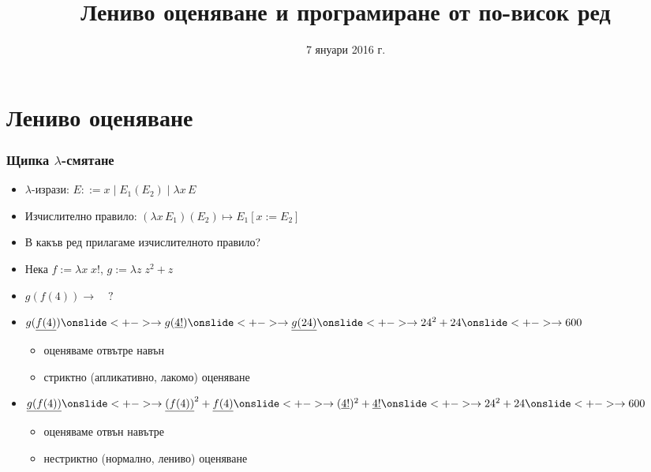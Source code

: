 \documentclass{beamer}
\title[Лениво оценяване]{Лениво оценяване и програмиране от по-висок ред}
\date{7 януари 2016 г.}
\begin{document}
\begin{frame}
  \titlepage
\end{frame}


\section{Лениво оценяване}

\begin{frame}
  \frametitle{Щипка $\lambda$-смятане}
  \newcommand{\lra}{\rightarrow}
  \begin{itemize}[<+->]
  \item $\lambda$-изрази: $E ::= x \;|\; E_1(E_2) \;|\; \lambda x\, E$
  \item Изчислително правило: $(\lambda x\,E_1)(E_2) \mapsto E_1[x := E_2]$
  \item В какъв ред прилагаме изчислителното правило?
  \item Нека $f := \lambda x\; x!$, $g := \lambda z\;z^2+z$
  \item $g(f(4)) \lra \quad ?$
  \item $g(\underline{f(4)})
    \onslide<+->
    \lra g(\underline{4!})
    \onslide<+->
    \lra \underline{g(24)}
    \onslide<+->
    \lra 24^2 + 24
    \onslide<+->
    \lra 600$
    \begin{itemize}
    \item<16-> оценяваме \alert{отвътре навън}
    \item<17-> \alert{стриктно} (апликативно, лакомо) оценяване
    \end{itemize}
  \item $\underline{g(f(4))}
    \onslide<+->
    \lra \underline{(f(4))}^2 + \underline{f(4)}
    \onslide<+->
    \lra (\underline{4!})^2 + \underline{4!}
    \onslide<+->
    \lra 24^2 + 24
    \onslide<+->
    \lra 600$
    \begin{itemize}
    \item<16-> оценяваме \alert{отвън навътре}
    \item<17-> \alert{нестриктно} (нормално, лениво) оценяване
    \end{itemize}
  \end{itemize}
\end{frame}
\end{document}
